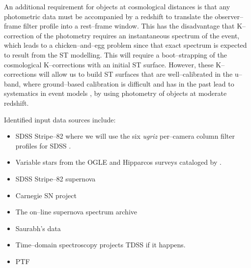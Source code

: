 An additional requirement for objects at cosmological distances is that any
photometric data must be accompanied by a redshift to translate the
observer--frame filter profile into a rest--frame window. This has the
disadvantage that K--correction of the photometry \citep{2002astro.ph.10394H}
requires an instantaneous spectrum of the event, which leads to a
chicken--and--egg problem since that exact spectrum is expected to result from
the ST modelling.  This will require a boot--strapping of the cosmological
K--corrections with an initial ST surface.  However, these K--corrections will
allow us to build ST surfaces that are well--calibrated in the u--band, where
ground--based calibration is difficult and has in the past lead to systematics
in event models \citep{2009ApJS..185...32K}, by using photometry of objects at
moderate redshift.

Identified input data sources include:

\begin{itemize}


\item SDSS Stripe--82 where we will use the six {\it ugriz} per--camera column
filter profiles for SDSS \citep{2007AJ....134..973I}.

\item Variable stars from the OGLE and Hipparcos surveys cataloged by
\cite{2007A&A...475.1159D}.


\item SDSS Stripe--82 supernova

\item Carnegie SN project

\item The on--line supernova spectrum archive

\item Saurabh's data

\item Time--domain spectroscopy projects TDSS if it happens.


\item PTF

\end{itemize}


\smallskip

